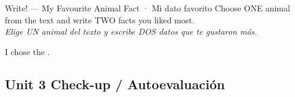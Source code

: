 \vspace{14pt}

\begin{activity}{Write! — My Favourite Animal Fact · Mi dato favorito}
Choose ONE animal from the text and write TWO facts you liked most. \\
\textit{Elige UN animal del texto y escribe DOS datos que te gustaron más.}

\medskip
I chose the \answerline[6cm].

\writinglines[5]
\end{activity}

\vspace{10pt}

\subsection*{ Unit 3 Check-up / Autoevaluación}

\begin{center}
\selfcheck[4]
\end{center}
